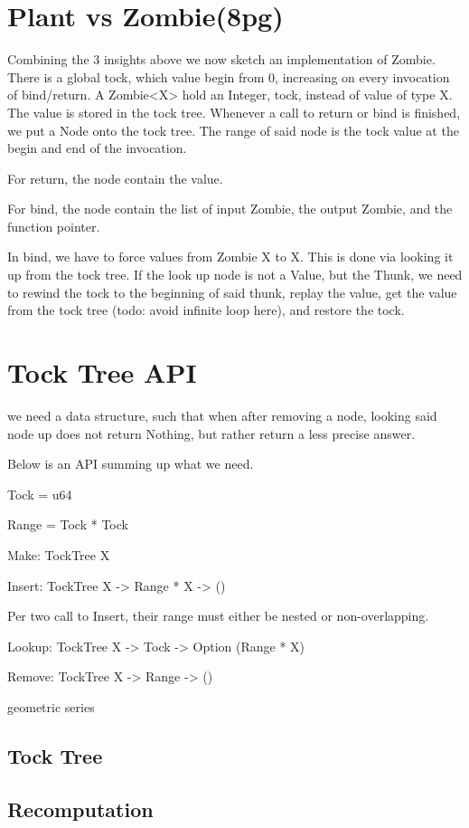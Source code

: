 \section{Plant vs Zombie(8pg)}
Combining the 3 insights above we now sketch an implementation of Zombie.
There is a global tock, which value begin from 0, increasing on every invocation of bind/return.
A Zombie<X> hold an Integer, tock, instead of value of type X.
The value is stored in the tock tree.
Whenever a call to return or bind is finished, we put a Node onto the tock tree.
The range of said node is the tock value at the begin and end of the invocation.

For return, the node contain the value.

For bind, the node contain the list of input Zombie, the output Zombie, and the function pointer.

In bind, we have to force values from Zombie X to X. This is done via looking it up from the tock tree. If the look up node is not a Value, but the Thunk, we need to rewind the tock to the beginning of said thunk, replay the value, get the value from the tock tree (todo: avoid infinite loop here), and restore the tock.

\section{Tock Tree API}
we need a data structure, such that when after removing a node, looking said node up does not return Nothing, but rather return a less precise answer.

Below is an API summing up what we need.

Tock = u64

Range = Tock * Tock

Make: TockTree X

Insert: TockTree X -> Range * X -> ()

Per two call to Insert, their range must either be nested or non-overlapping.

Lookup: TockTree X -> Tock -> Option (Range * X)

Remove: TockTree X -> Range -> ()

geometric series
\subsection{Tock Tree}
\subsection{Recomputation}
